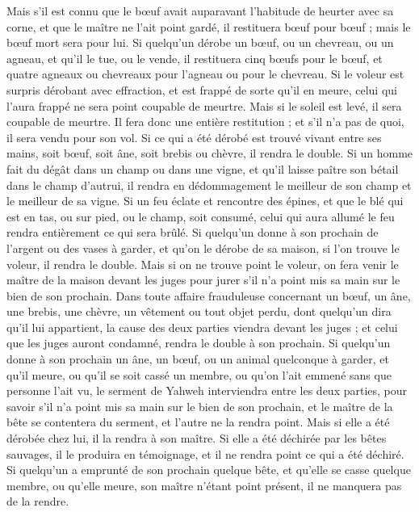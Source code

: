 \begin{multicols}{2}
Mais s'il est connu que le bœuf avait auparavant l’habitude de heurter avec sa corne, et que le maître ne l'ait point gardé, il restituera bœuf pour bœuf ; mais le bœuf mort sera pour lui.
\VerseOne{}Si quelqu'un dérobe un bœuf, ou un chevreau, ou un agneau, et qu'il le tue, ou le vende, il restituera cinq bœufs pour le bœuf, et quatre agneaux ou chevreaux pour l'agneau ou pour le chevreau.
Si le voleur est surpris dérobant avec effraction, et est frappé de sorte qu'il en meure, celui qui l'aura frappé ne sera point coupable de meurtre.
Mais si le soleil est levé, il sera coupable de meurtre. Il fera donc une entière restitution ; et s'il n'a pas de quoi, il sera vendu pour son vol.
Si ce qui a été dérobé est trouvé vivant entre ses mains, soit bœuf, soit âne, soit brebis ou chèvre, il rendra le double.
Si un homme fait du dégât dans un champ ou dans une vigne, et qu’il laisse paître son bétail dans le champ d’autrui, il rendra en dédommagement le meilleur de son champ et le meilleur de sa vigne.
Si un feu éclate et rencontre des épines, et que le blé qui est en tas, ou sur pied, ou le champ, soit consumé, celui qui aura allumé le feu rendra entièrement ce qui sera brûlé.
Si quelqu'un donne à son prochain de l'argent ou des vases à garder, et qu'on le dérobe de sa maison, si l'on trouve le voleur, il rendra le double\FTNT{}.
Mais si on ne trouve point le voleur, on fera venir le maître de la maison devant les juges pour jurer s'il n'a point mis sa main sur le bien de son prochain.
Dans toute affaire frauduleuse concernant un bœuf, un âne, une brebis, une chèvre, un vêtement ou tout objet perdu, dont quelqu'un dira qu'il lui appartient, la cause des deux parties viendra devant les juges ; et celui que les juges auront condamné, rendra le double à son prochain.
Si quelqu'un donne à son prochain un âne, un bœuf, ou un animal quelconque à garder, et qu'il meure, ou qu'il se soit cassé un membre, ou qu'on l'ait emmené sans que personne l'ait vu,
le serment de Yahweh interviendra entre les deux parties\FTNT{}, pour savoir s'il n'a point mis sa main sur le bien de son prochain, et le maître de la bête se contentera du serment, et l'autre ne la rendra point.
Mais si elle a été dérobée chez lui, il la rendra à son maître.
Si elle a été déchirée par les bêtes sauvages, il le produira en témoignage, et il ne rendra point ce qui a été déchiré.
Si quelqu'un a emprunté de son prochain quelque bête, et qu'elle se casse quelque membre, ou qu'elle meure, son maître n'étant point présent, il ne manquera pas de la rendre.

\end{multicols}
